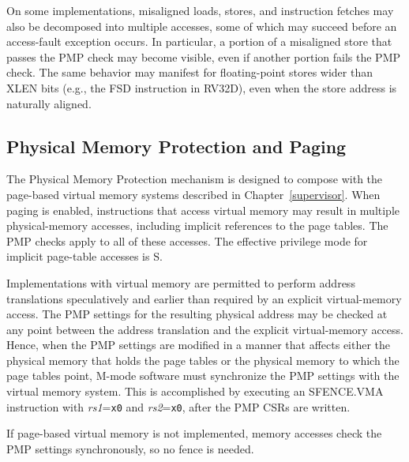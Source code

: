 On some implementations, misaligned loads, stores, and instruction fetches may
also be decomposed into multiple accesses, some of which may succeed before an
access-fault exception occurs.  In particular, a portion of a misaligned store
that passes the PMP check may become visible, even if another portion fails
the PMP check.  The same behavior may manifest for floating-point stores wider
than XLEN bits (e.g., the FSD instruction in RV32D), even when the store
address is naturally aligned.

\subsection{Physical Memory Protection and Paging}
\label{pmp-vmem}

The Physical Memory Protection mechanism is designed to compose with the
page-based virtual memory systems described in Chapter~\ref{supervisor}.  When
paging is enabled, instructions that access virtual memory may result in
multiple physical-memory accesses, including implicit references to the page
tables.  The PMP checks apply to all of these accesses.  The effective
privilege mode for implicit page-table accesses is S.

Implementations with virtual memory are permitted to perform address
translations speculatively and earlier than required by an explicit
virtual-memory access.  The PMP settings for the resulting physical address
may be checked at any point between the address translation and the explicit
virtual-memory access.  Hence, when the PMP settings are modified in a manner
that affects either the physical memory that holds the page tables or the
physical memory to which the page tables point, M-mode software must
synchronize the PMP settings with the virtual memory system.  This is
accomplished by executing an SFENCE.VMA instruction with {\em rs1}={\tt x0}
and {\em rs2}={\tt x0}, after the PMP CSRs are written.

If page-based virtual memory is not implemented,
memory accesses check the PMP settings synchronously, so no fence is needed.
